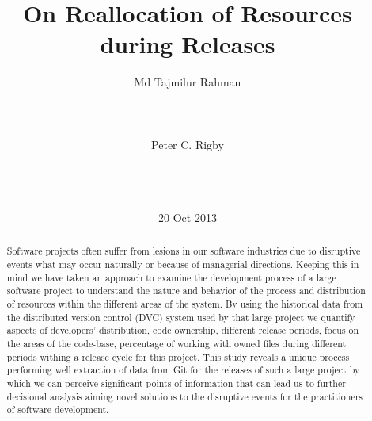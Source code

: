 \documentclass{acm_proc_article-sp}
\begin{document}
\title{On Reallocation of Resources during Releases }
\author{
\alignauthor
Md Tajmilur Rahman\\
       \\
       \\
       \\
\alignauthor
Peter C. Rigby\\
       \\
       \\
       \\
}
\date{20 Oct 2013}
\maketitle
\begin{abstract}
Software projects often suffer from lesions in our software industries due to disruptive events what may occur naturally or because of managerial directions. Keeping this in mind we have taken an approach to examine the development process of a large software project to understand the nature and behavior of the process and distribution of resources within the different areas of the system. By using the historical data from the distributed version control (DVC) system used by that large project we quantify aspects of developers' distribution, code ownership, different release periods, focus on the areas of the code-base, percentage of working with owned files during different periods withing a release cycle for this project. This study reveals a unique process performing well extraction of data from Git for the releases of such a large project by which we can perceive significant points of information that can lead us to further decisional analysis aiming novel solutions to the disruptive events for the practitioners of software development.

\end{abstract}
\end{document}
